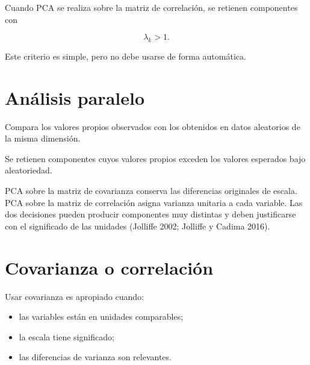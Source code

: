 \documentclass[
  spanish,
  10.5pt,
  letterpaper,
  DIV=11,
  numbers=noendperiod,
  oneside,
  open=any]{scrreprt}
\providecommand{\tightlist}{%
  \setlength{\itemsep}{0pt}\setlength{\parskip}{0pt}}
\theoremstyle{definition}
\theoremstyle{definition}
\theoremstyle{plain}
\theoremstyle{remark}
\begin{document}

Cuando PCA se realiza sobre la matriz de correlación, se retienen
componentes con

\[
\lambda_k>1.
\]

Este criterio es simple, pero no debe usarse de forma automática.

\section*{Análisis paralelo}\label{anuxe1lisis-paralelo}


Compara los valores propios observados con los obtenidos en datos
aleatorios de la misma dimensión.

Se retienen componentes cuyos valores propios exceden los valores
esperados bajo aleatoriedad.

\begin{tcolorbox}[enhanced jigsaw, arc=.35mm, bottomrule=.15mm, bottomtitle=1mm, breakable, colback=white, colbacktitle=quarto-callout-warning-color!10!white, colframe=quarto-callout-warning-color-frame, coltitle=black, left=2mm, leftrule=.75mm, opacityback=0, opacitybacktitle=0.6, rightrule=.15mm, title=\textcolor{quarto-callout-warning-color}{\faExclamationTriangle}\hspace{0.5em}{Decisión crítica: estandarizar o no}, titlerule=0mm, toprule=.15mm, toptitle=1mm]

PCA sobre la matriz de covarianza conserva las diferencias originales de
escala. PCA sobre la matriz de correlación asigna varianza unitaria a
cada variable. Las dos decisiones pueden producir componentes muy
distintas y deben justificarse con el significado de las unidades
(Jolliffe 2002; Jolliffe y Cadima 2016).

\end{tcolorbox}

\section*{Covarianza o correlación}\label{covarianza-o-correlaciuxf3n}


Usar covarianza es apropiado cuando:

\begin{itemize}
\tightlist
\item
  las variables están en unidades comparables;
\item
  la escala tiene significado;
\item
  las diferencias de varianza son relevantes.
\end{itemize}
\end{document}

